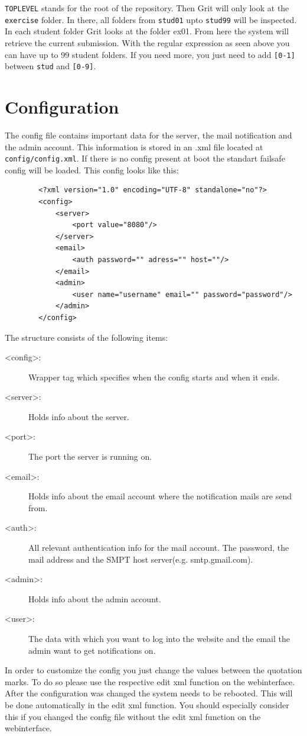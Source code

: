 \documentclass[10pt,a4paper, titlepage, toc=idx]{scrreprt}
\theoremstyle{definition}
\theoremstyle{plain}
\newcommand*{\product}{Grit}
\begin{document}
        \texttt{TOPLEVEL} stands for the root of the repository. Then
        \product{} will only look at the \texttt{exercise} folder. In
        there, all folders from \texttt{stud01} upto \texttt{stud99}
        will be inspected. In each student folder \product{} looks at the folder ex01. From
        here the system will retrieve the current submission. With the regular expression as seen above you can have up to 99 student folders. If you need more, you just need to add  \texttt{[0-1]} between \texttt{stud} and \texttt{[0-9]}.
        
	\section{Configuration}\label{config} 
		The config file contains important data for the server, the mail 			notification and the admin account. This information is stored in 		an .xml file located at \texttt{config/config.xml}. If there is 			no config present at boot the standart failsafe config will be 				loaded. This config looks like this:
		\newpage
		\begin{lstlisting}
		<?xml version="1.0" encoding="UTF-8" standalone="no"?>
		<config>
			<server>
				<port value="8080"/>
			</server>
			<email>
				<auth password="" adress="" host=""/>
			</email>
			<admin>
				<user name="username" email="" password="password"/>
			</admin>
		</config>
	    \end{lstlisting}		   
       	The structure consists of the following items:
       	\begin{description}
        \item[<config>:] Wrapper tag which specifies when the config 					starts and when it ends.
        \item[<server>:] Holds info about the server.
        \item[<port>:] The port the server is running on.
        \item[<email>:] Holds info about the email account where the							notification mails are send from.
        \item[<auth>:] All relevant authentication info for the mail account. The password, the mail address and the SMPT host server(e.g. smtp.gmail.com).
        \item[<admin>:] Holds info about the admin account.
        \item[<user>:] The data with which you want to log into the website and the email the admin want to get notifications on.
		\end{description}
		In order to customize the config you just change the values between the quotation marks. To do so please use the respective edit xml function on the webinterface. After the configuration was changed the system needs to be rebooted. This will be done automatically in the edit xml function. You should especially consider this if you changed the config file without the edit xml function on the webinterface.
		
\end{document}
